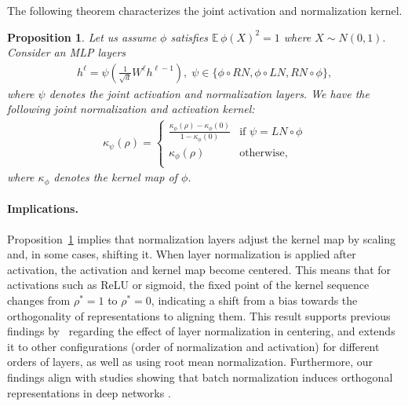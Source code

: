 \documentclass[twoside]{article}
\newcommand{\E}{\mathbb{E}\,}
\newtheorem{proposition}{Proposition}
\theoremstyle{definition}
\begin{document}
The following theorem characterizes the joint activation and normalization kernel.

\begin{proposition}
\label{prop:normalization_kernel_map}
Let us assume $\phi$ satisfies $\E \phi(X)^2 = 1$ where $X\sim N(0,1).$ Consider an MLP layers 
\begin{align*}
    h^\ell = \psi\left( \frac{1}{\sqrt{d}}W^\ell h^{\ell-1}\right),
    \; \psi \in \{\phi\circ RN,\phi\circ LN, RN\circ \phi\},
\end{align*}
where $\psi$ denotes the joint activation and normalization layers. 
We have the following joint normalization and activation kernel:
\begin{align*}
    \kappa_\psi(\rho) = \begin{cases}
         \frac{\kappa_\phi(\rho)-\kappa_\phi(0)}{1-\kappa_\phi(0)} & \text{if } \psi=LN\circ \phi\\
        \kappa_\phi(\rho) & \text{otherwise},\\
    \end{cases}
\end{align*}
where $\kappa_\phi$ denotes the kernel map of $\phi$. 
\end{proposition}


\paragraph{Implications.}
Proposition~\ref{prop:normalization_kernel_map} implies that normalization layers adjust the kernel map by scaling and, in some cases, shifting it. When layer normalization is applied after activation, the activation and kernel map become centered. This means that for activations such as ReLU or sigmoid, the fixed point of the kernel sequence changes from $\rho^*=1$ to $\rho^*=0$, indicating a shift from a bias towards the orthogonality of representations to aligning them. This result supports previous findings by~\citet{joudaki2023impact} regarding the effect of layer normalization in centering, and extends it to other configurations (order of normalization and activation) for different orders of layers, as well as using root mean normalization. Furthermore, our findings align with studies showing that batch normalization induces orthogonal representations in deep networks \citep{yang2019meanfield,daneshmand2021batch}.
\end{document}
